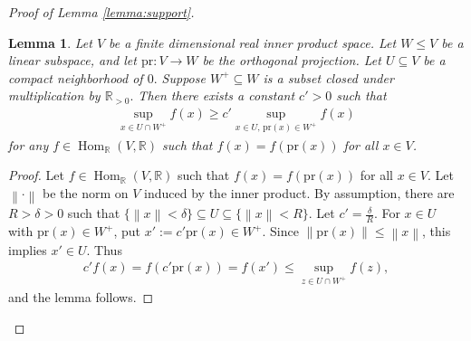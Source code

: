 \documentclass[10pt]{amsart}
\newcommand{\norm}[1]{\left\lVert#1\right\rVert} %
\newtheorem{lemma}[theorem]{Lemma}
\theoremstyle{definition}
\numberwithin{equation}{section}
\DeclareMathOperator{\Hom}{\mathrm{Hom}}
\numberwithin{equation}{subsection}
\newcommand{\RR}{\mathbb{R}}
\begin{document}
\begin{proof}[Proof of Lemma \ref{lemma:support}]
\begin{lemma} Let $V$ be a finite dimensional real inner product space. Let $W\leq V$ be a linear subspace, and let $\mathrm{pr}:V\to W$ be the orthogonal projection. Let $U\subseteq V$ be a compact neighborhood of $0.$ Suppose $W^+\subseteq W$ is a subset closed under multiplication by $\RR_{>0}.$ Then there exists a constant $c'>0$ such that
\begin{align*}
    \sup_{x\in U\cap W^+} f(x) \geq c' \sup_{x\in U,\,\mathrm{pr}(x)\in W^+}f(x)
\end{align*}
for any $f\in \Hom_\RR(V,\RR)$ such that $f(x) = f(\mathrm{pr}(x))$ for all $x\in V$. 
\end{lemma}
\begin{proof} 
Let $f\in \Hom_\RR(V,\RR)$ such that $f(x) = f(\mathrm{pr}(x))$ for all $x\in V$. Let $\norm{\cdot}$ be the norm on $V$ induced by the inner product. By assumption, there are $R>\delta>0$ such that $\{\norm{x}<\delta\}\subseteq U\subseteq \{\norm{x}<R\}$. Let $c' = \frac{\delta}{R}$. For $x\in U$ with $\mathrm{pr}(x)\in W^+$, put $x':=c'\mathrm{pr}(x)\in W^+$. Since $\norm{\mathrm{pr}(x)}\leq\norm{x}$, this implies $x'\in U$. Thus
\begin{align*}
    c'f(x) = f(c'\mathrm{pr}(x)) =  f(x') \leq  \sup_{z\in U\cap W^+} f(z),
\end{align*}
and the lemma follows.
\end{proof}


\end{proof}
\end{document}
